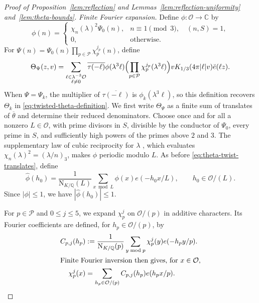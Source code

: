 \documentclass[11pt,a4paper]{article}
\numberwithin{equation}{section}
\numberwithin{figure}{section}
\theoremstyle{definition}
\theoremstyle{remark}
\newcommand{\Q}{\mathbb Q}
\newcommand{\NK}{\mathrm N_{K/\Q}}
\newcommand{\OO}{\mathcal O}
\begin{document}
\begin{proof}[Proof of Proposition~\ref{lem:reflection} and Lemmas~\ref{lem:reflection-uniformity} and~\ref{lem:theta-bounds}]

\noindent\textit{Finite Fourier expansion.}\quad
Define $\phi:\OO\to\mathbb C$ by
\[
 \phi(n)=
 \begin{cases}
  \chi_n(\lambda)^2\Psi_0(n),&n\equiv1\pmod3,\quad(n,S)=1,\\
  0,&\text{otherwise}.
 \end{cases}
\]
For $\Psi(n)=\Psi_0(n)\prod_{p\in\mathcal P}\chi_p^{j_p}(n)$, define
\begin{equation}\label{eq:general-twisted-theta-definition}
 \Theta_\Psi(z,v)=
 \sum_{\substack{\ell\in\lambda^{-3}\OO\\\ell\ne0}}
 \overline{\tau(-\ell)}\phi(\lambda^3\ell)
 \Bigl(\prod_{p\in\mathcal P}\chi_p^{j_p}(\lambda^3\ell)\Bigr)
 vK_{1/3}(4\pi|\ell|v)\breve e(\ell z).
\end{equation}
When $\Psi=\Psi_k$, the multiplier of $\overline{\tau(-\ell)}$
is $\phi_k(\lambda^3\ell)$, so this definition recovers
$\Theta_k$ in \eqref{eq:twisted-theta-definition}.
We first write $\Theta_\Psi$ as a finite sum of translates of
$\overline\theta$ and determine their reduced denominators.
Choose once and for all a nonzero $L\in\OO$, with prime divisors in
$S$, divisible by the conductor of $\Psi_0$, every prime in $S$,
and sufficiently high powers of the primes above $2$ and $3$.
The supplementary law of cubic reciprocity for $\lambda$
\cite[(1.5)]{DR}, which evaluates $\chi_n(\lambda)^2=(\lambda/n)_3$,
makes $\phi$ periodic modulo $L$.
As before \eqref{eq:theta-twist-translates}, define
\[
 \widehat\phi(h_0)=\frac1{\NK(L)}\sum_{x\bmod L}\phi(x)e(-h_0x/L),
 \qquad h_0\in\OO/(L).
\]
Since $|\phi|\le1$, we have $|\widehat\phi(h_0)|\le1$.

For $p\in\mathcal P$ and $0\le j\le5$, we expand $\chi_p^j$ on $\OO/(p)$
in additive characters. Its Fourier coefficients are defined,
for $h_p\in\OO/(p)$, by
\begin{align}
 C_{p,j}(h_p)&:=\frac1{\NK(p)}\sum_{y\bmod p}\chi_p^j(y)e(-h_py/p).
 \notag\\
 \intertext{Finite Fourier inversion then gives, for $x\in\OO$,}
 \chi_p^j(x)&=\sum_{h_p\in\OO/(p)}C_{p,j}(h_p)e(h_px/p).
 \label{eq:theta-local-fourier}
\end{align}


\end{proof}
\end{document}
